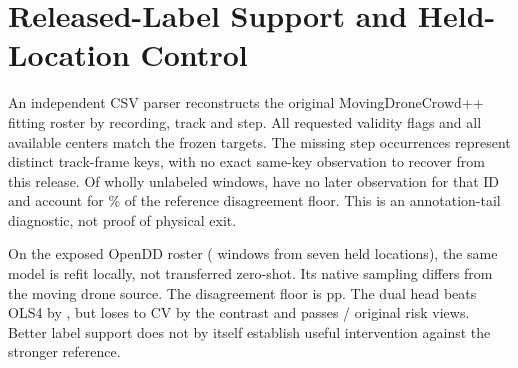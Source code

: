 \section{Released-Label Support and Held-Location Control}
An independent CSV parser reconstructs the original MovingDroneCrowd++
fitting roster by recording, track and step. All \RawSupportSteps{}
requested validity flags and all available centers match the frozen
targets. The \RawSupportAbsent{} missing step occurrences represent
\RawSupportKeys{} distinct track-frame keys, with no exact same-key
observation to recover from this release. Of \RawSupportWhole{}
wholly unlabeled windows, \RawSupportNoLater{} have no later
observation for that ID and account for \RawSupportTerminalShare\%
of the reference disagreement floor. This is an annotation-tail
diagnostic, not proof of physical exit.

On the exposed OpenDD roster (\RawSupportOpenRows{} windows from
seven held locations), the same model is refit locally, not
transferred zero-shot. Its native sampling differs from the moving
drone source. The disagreement floor is \RawSupportOpenFloor{} pp.
The dual head beats OLS4 by \RawSupportOpenOLS{}, but loses to CV by
the contrast \RawSupportOpenCV{} and passes \RawSupportOpenRisk/
\RawSupportOpenViews{} original risk views. Better label support
does not by itself establish useful intervention against the
stronger reference.
